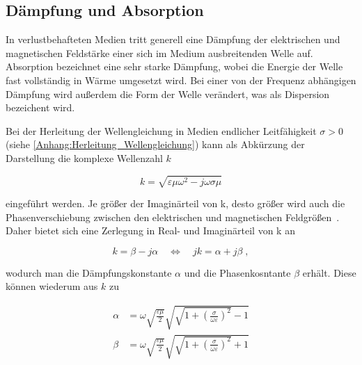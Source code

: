 \subsection{Dämpfung und Absorption}\label{cha:2_sub_Daempfung_und_Absorption}
In verlustbehafteten Medien tritt generell eine Dämpfung der elektrischen und magnetischen Feldstärke einer sich im Medium ausbreitenden Welle auf. Absorption bezeichnet eine sehr starke Dämpfung, wobei die Energie der Welle fast vollständig in Wärme umgesetzt wird. Bei einer von der Frequenz abhängigen Dämpfung wird außerdem die Form der Welle verändert, was als Dispersion bezeichent wird. 
\par
\vspace{\linespace}
Bei der Herleitung der Wellengleichung in Medien endlicher Leitfähigkeit $\sigma > 0$ (siehe \Anhang \ref{Anhang:Herleitung_Wellengleichung}) kann als Abkürzung der Darstellung die komplexe Wellenzahl $k$

\begin{equation}
    k = \sqrt{\varepsilon \mu \omega^2 - j \omega \sigma \mu}
\end{equation}

eingeführt werden. Je größer der Imaginärteil von k, desto größer wird auch die Phasenverschiebung zwischen den elektrischen und magnetischen Feldgrößen~\cite{EM_Schirmung}. Daher bietet sich eine Zerlegung in Real- und Imaginärteil von k an

\begin{equation}
    k = \beta - j \alpha \quad \Leftrightarrow \quad jk = \alpha + j\beta \; ,
\end{equation}

wodurch man die Dämpfungskonstante $\alpha$ und die Phasenkosntante $\beta$ erhält. Diese können wiederum aus $k$ zu

\begin{align}
    \alpha &= \omega \sqrt{\frac{\varepsilon \mu}{2}} \sqrt{\sqrt{1+\left(\frac{\sigma}{\omega\varepsilon}\right)^2}-1} \\
    \beta &= \omega \sqrt{\frac{\varepsilon \mu}{2}} \sqrt{\sqrt{1+\left(\frac{\sigma}{\omega\varepsilon}\right)^2}+1}
\end{align}

